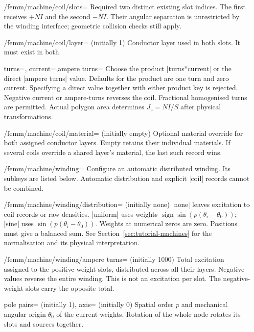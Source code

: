 \begin{key}{/femm/machine/coil/slots=}
Required two distinct existing slot indices. The first receives $+NI$ and
the second $-NI$. Their angular separation is unrestricted by the winding
interface; geometric collision checks still apply.
\end{key}
\begin{key}{/femm/machine/coil/layer= (initially 1)}
Conductor layer used in both slots. It must exist in both.
\end{key}
\begin{keylist}{turns=,
 current=,ampere turns=}
Choose the product |turns*current| or the direct |ampere turns| value.
Defaults for the product are one turn and zero current. Specifying a direct
value together with either product key is rejected. Negative current or
ampere-turns reverses the coil. Fractional homogenised turns are permitted.
Actual polygon area determines $J_z=NI/S$ after physical transformations.
\end{keylist}
\begin{key}{/femm/machine/coil/material= (initially empty)}
Optional material override for both assigned conductor layers. Empty retains
their individual materials. If several coils override a shared layer's
material, the last such record wins.
\end{key}
\begin{key}{/femm/machine/winding=}
Configure an automatic distributed winding. Its subkeys are listed below.
Automatic distribution and explicit |coil| records cannot be combined.
\end{key}
\begin{key}{/femm/machine/winding/distribution= (initially none)}
|none| leaves excitation to coil records or raw densities. |uniform| uses
weights $\operatorname{sign}\sin(p(\theta_i-\theta_0))$; |sine| uses
$\sin(p(\theta_i-\theta_0))$. Weights at numerical zeros are zero. Positions
must give a balanced sum. See Section~\ref{sec:tutorial-machines} for the
normalisation and its physical interpretation.
\end{key}
\begin{key}{/femm/machine/winding/ampere turns= (initially 1000)}
Total excitation assigned to the positive-weight slots, distributed across
all their layers. Negative values reverse the entire winding. This is not an
excitation per slot. The negative-weight slots carry the opposite total.
\end{key}
\begin{keylist}{pole pairs= (initially 1),
 axis= (initially 0)}
Spatial order $p$ and mechanical angular origin $\theta_0$ of the current
weights. Rotation of the whole node rotates its slots and sources together.
\end{keylist}

